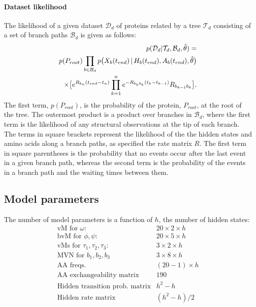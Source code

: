\documentclass[nogrid]{MBE}%
\begin{document}
\paragraph{Dataset likelihood}
The likelihood of a given dataset $\mathcal{D}_d$ of proteins related by a tree $\mathcal{T}_d$ consisting of a set of branch paths $\mathcal{B}_d$  is given as follows:
\begin{align}
p(\mathcal{D}_d|\mathcal{T}_d,\mathcal{B}_d,\hat{\theta})=\notag\\
p(P_{root})\prod_{b \in \mathcal{B}_d} p\big(X_{b}(t_{end})\,|\,H_{b}(t_{end}),A_{b}(t_{end}),\hat{\theta}\big)\notag\\ 
\times \big[e^{R_{b_{n}}(t_{end}-t_{n})} \prod_{k=1}^{n}  e^{-R_{b_{k}b_{k}}(t_{k}-t_{k-1})} R_{b_{k-1}b_{k}} \big].
\end{align}
The first term, $p(P_{root})$, is the probability of the protein, $P_{root}$, at the root of the tree. The outermost product is a product over branches in $\mathcal{B}_d$, where the first term is the likelihood of any structural observations at the tip of each branch. The terms in square brackets represent the likelihood of the the hidden states and amino acids along a branch paths, as specified the rate matrix $R$. The first term in square parentheses is the probability that no events occur after the last event in a given branch path, whereas the second term is the probability of the events in a branch path and the waiting times between them.

\subsection{Model parameters}
The number of model parameters is a function of $h$, the number of hidden states:
\begin{equation*}
\begin{array}{ccc}
	\text{vM for }\omega: & 20\times2\times h\\
	\text{bvM for }\phi,\psi: & 20\times5\times h\\
	\text{vMs for }\tau_{1},\tau_{2},\tau_{3}: & 3\times2\times h\\
	\text{MVN for }b_{1},b_{2},b_{3} & 3\times8\times h\\
	\text{AA freqs.} & (20-1)\times h\\
	\text{AA exchangeability matrix} & 190\\
	\text{Hidden transition prob. matrix} & h^{2}-h\\
	\text{Hidden rate matrix} & (h^{2}-h)/2
\end{array}
\end{equation*}
\end{document}

